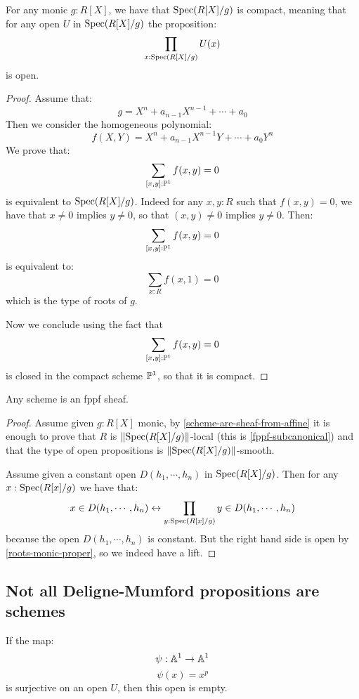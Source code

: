 \begin{lemma}\label{roots-monic-proper}
For any monic $g:R[X]$, we have that $\operatorname{Spec}(R[X]/g)$ is compact, meaning that for any open $U$ in $\operatorname{Spec}(R[X]/g)$ the proposition:
\[\prod_{x:\operatorname{Spec}(R[X]/g)}U(x)\]
is open.
\end{lemma}

\begin{proof}
Assume that:
\[g=X^n+a_{n-1}X^{n-1}+\cdots+a_0\]
Then we consider the homogeneous polynomial:
\[f(X,Y) = X^n + a_{n-1}X^{n-1}Y+\cdots+a_0Y^n\]
We prove that:
\[\sum_{[x,y]:\mathbb{P}^1}f(x,y) = 0\]
is equivalent to $\operatorname{Spec}(R[X]/g)$. Indeed for any $x,y:R$ such that $f(x,y)=0$, we have that $x\not=0$ implies $y\not=0$, so that $(x,y)\not=0$ implies $y\not=0$. Then:
\[\sum_{[x,y]:\mathbb{P}^1}f(x,y) = 0\]
is equivalent to:
\[\sum_{x:R} f(x,1)=0\]
which is the type of roots of $g$. 

Now we conclude using the fact that 
\[\sum_{[x,y]:\mathbb{P}^1}f(x,y) = 0\]
is closed in the compact scheme $\mathbb{P}^1$, so that it is compact.
\end{proof}

\begin{proposition}\label{schemes-are-fppf-sheaves}
Any scheme is an fppf sheaf.
\end{proposition}

\begin{proof}
Assume given $g:R[X]$ monic, by \cref{scheme-are-sheaf-from-affine} it is enough to prove that $R$ is $\lVert \operatorname{Spec}(R[X]/g) \rVert$-local (this is \cref{fppf-subcanonical}) and that the type of open propositions is $\lVert \operatorname{Spec}(R[X]/g) \rVert$-smooth. 

Assume given a constant open $D(h_1,\cdots,h_n)$ in $\operatorname{Spec}(R[X]/g)$. Then for any $x:\operatorname{Spec}(R[x]/g)$ we have that:
\[x\in D(h_1,\cdots,h_n) \leftrightarrow \prod_{y:\operatorname{Spec}(R[x]/g)} y\in D(h_1,\cdots,h_n)\]
because the open $D(h_1,\cdots,h_n)$ is constant. But the right hand side is open by \cref{roots-monic-proper}, so we indeed have a lift.
\end{proof}

\subsection{Not all Deligne-Mumford propositions are schemes}

\begin{lemma}\label{no-roots-for-any-p}
If the map:
\[\psi:\mathbb{A}^1\to \mathbb{A}^1\]
\[\psi(x)=x^p\] 
is surjective on an open $U$, then this open is empty.
\end{lemma}

